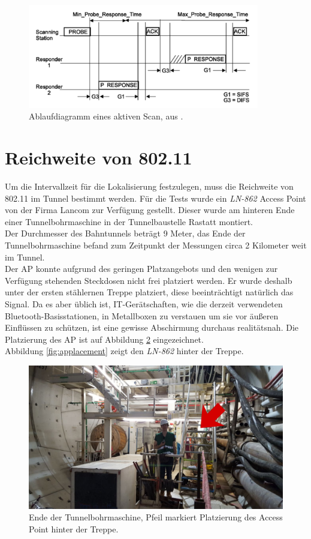 \begin{figure}[h]
  \centering
	\includegraphics[width=0.9\textwidth]{images/activescan.png}
  \caption{Ablaufdiagramm eines aktiven Scan, aus \cite{ieee2012active}.}
  \label{fig:activescan}
\end{figure}


\section{Reichweite von 802.11}
\label{ch:phase1:sec:rangewlan}
Um die Intervallzeit für die Lokalisierung festzulegen, muss die Reichweite von 802.11 im Tunnel bestimmt werden.
Für die Tests wurde ein \emph{LN-862} Access Point von der Firma Lancom zur Verfügung gestellt.
Dieser wurde am hinteren Ende einer Tunnelbohrmaschine in der Tunnelbaustelle Rastatt montiert.\\
Der Durchmesser des Bahntunnels beträgt 9 Meter, das Ende der Tunnelbohrmaschine befand zum Zeitpunkt der Messungen circa 2 Kilometer weit im Tunnel.\\
Der AP konnte aufgrund des geringen Platzangebots und den wenigen zur Verfügung stehenden Steckdosen nicht frei platziert werden.
Er wurde deshalb unter der ersten stählernen Treppe platziert, diese beeinträchtigt natürlich das Signal.
Da es aber üblich ist, IT-Gerätschaften, wie die derzeit verwendeten Bluetooth-Basisstationen, in Metallboxen zu verstauen um sie vor äußeren Einflüssen zu schützen, ist eine gewisse Abschirmung durchaus realitätsnah.
Die Platzierung des AP ist auf Abbildung \ref{fig:tunnelmark} eingezeichnet.\\
Abbildung \ref{fig:applacement} zeigt den \emph{LN-862} hinter der Treppe.

\begin{figure}[h]
  \centering
	\includegraphics[width=\textwidth]{images/tunnelmark.png}
  \caption{Ende der Tunnelbohrmaschine, Pfeil markiert Platzierung des Access Point hinter der Treppe.}
  \label{fig:tunnelmark}
\end{figure}


